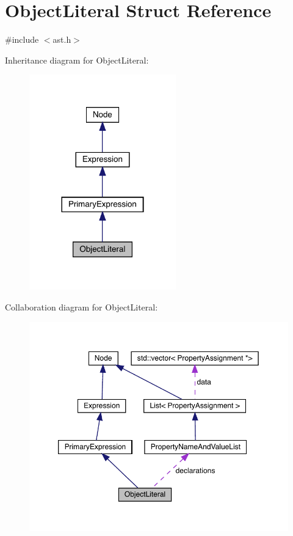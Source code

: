 \hypertarget{struct_object_literal}{}\section{Object\+Literal Struct Reference}
\label{struct_object_literal}


{\ttfamily \#include $<$ast.\+h$>$}



Inheritance diagram for Object\+Literal\+:\nopagebreak
\begin{figure}[H]
\begin{center}
\leavevmode
\includegraphics[width=180pt]{struct_object_literal__inherit__graph}
\end{center}
\end{figure}


Collaboration diagram for Object\+Literal\+:\nopagebreak
\begin{figure}[H]
\begin{center}
\leavevmode
\includegraphics[width=350pt]{struct_object_literal__coll__graph}
\end{center}
\end{figure}
